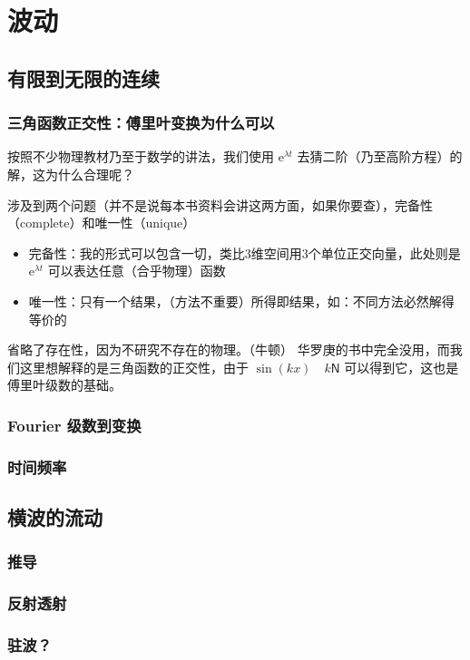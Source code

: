 \documentclass[11pt]{book}
\begin{document}
\part{波动}
\label{sec:org0e964a6}

\chapter{有限到无限的连续}
\label{sec:org592886b}
\section{三角函数正交性：傅里叶变换为什么可以}
\label{sec:org304d74c}
按照不少物理教材乃至于数学的讲法，我们使用 \(\mathrm{e}^{\lambda t}\) 去猜二阶（乃至高阶方程）的解，这为什么合理呢？

涉及到两个问题（并不是说每本书资料会讲这两方面，如果你要查），完备性（complete）和唯一性（unique）
\begin{itemize}
\item 完备性：我的形式可以包含一切，类比3维空间用3个单位正交向量，此处则是 \(\mathrm{e}^{\lambda t}\) 可以表达任意（合乎物理）函数
\item 唯一性：只有一个结果，（方法不重要）所得即结果，如：不同方法必然解得等价的
\end{itemize}
省略了存在性，因为不研究不存在的物理。（牛顿）
华罗庚的书中完全没用，而我们这里想解释的是三角函数的正交性，由于 \(\sin(kx)\quad k \mathsf{N}\) 可以得到它，这也是傅里叶级数的基础。
\section{Fourier 级数到变换}
\label{sec:org75ab1f8}
\section{时间频率}
\label{sec:orgafdee64}
\chapter{横波的流动}
\label{sec:org6b46203}
\section{推导}
\label{sec:org3b4e8d0}
\section{反射透射}
\label{sec:orgf2ac31a}
\section{驻波？}
\label{sec:orge71be62}
\end{document}
